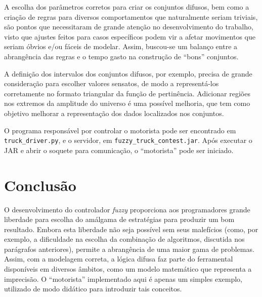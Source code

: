 \documentclass{article}
\begin{document}
A escolha dos parâmetros corretos para criar os conjuntos difusos, bem como
a criação de regras para diversos comportamentos que naturalmente seriam
triviais, são pontos que necessitaram de grande atenção no desenvolvimento do
trabalho, visto que ajustes feitos para casos específicos podem vir a afetar
movimentos que seriam óbvios e/ou fáceis de modelar. Assim, buscou-se um
balanço entre a abrangência das regras e o tempo gasto na construção de
``bons'' conjuntos. \medskip

A definição dos intervalos dos conjuntos difusos, por exemplo, precisa de
grande consideração para escolher valores sensatos, de modo a representá-los
corretamente no formato triangular da função de pertinência. Adicionar regiões
nos extremos da amplitude do universo é uma  possível melhoria, que tem como
objetivo melhorar a representação dos dados localizados nos conjuntos. \medskip

O programa responsável por controlar o motorista pode ser encontrado em
\texttt{truck\_driver.py}, e o servidor, em \texttt{fuzzy\_truck\_contest.jar}.
Após executar o JAR e abrir o soquete para comunicação, o ``motorista'' pode
ser iniciado.

\section{Conclusão}

O desenvolvimento do controlador \emph{fuzzy} proporciona aos programadores
grande liberdade para escolha do amálgama de estratégias para produzir um bom
resultado. Embora esta liberdade não seja possível sem seus malefícios (como,
por exemplo, a dificuldade na escolha da combinação de algoritmos, discutida
nos parágrafos anteriores), permite a abrangência de uma maior gama de
problemas. Assim, com a modelagem correta, a lógica difusa faz parte do
ferramental disponíveis em diversos âmbitos, como um modelo matemático que
representa a imprecisão. O ``motorista'' implementado aqui é apenas um simples
exemplo, utilizado de modo didático para introduzir tais conceitos.
\end{document}
